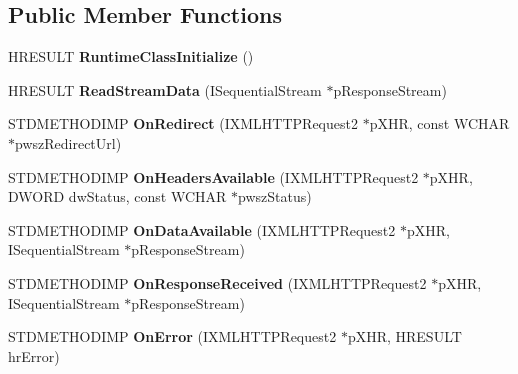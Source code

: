 \subsection*{Public Member Functions}
\begin{DoxyCompactItemize}
\item 
\mbox{\label{classnetwork_1_1CXHR2Callback_a0b409a974aa73213b058d9627a95bb62}} 
H\+R\+E\+S\+U\+LT {\bfseries Runtime\+Class\+Initialize} ()
\item 
\mbox{\label{classnetwork_1_1CXHR2Callback_a19e4f5c8202744a013a70d698154fb11}} 
H\+R\+E\+S\+U\+LT {\bfseries Read\+Stream\+Data} (I\+Sequential\+Stream $\ast$p\+Response\+Stream)
\item 
\mbox{\label{classnetwork_1_1CXHR2Callback_a557f73de73cba3965d13bdb789138c56}} 
S\+T\+D\+M\+E\+T\+H\+O\+D\+I\+MP {\bfseries On\+Redirect} (I\+X\+M\+L\+H\+T\+T\+P\+Request2 $\ast$p\+X\+HR, const W\+C\+H\+AR $\ast$pwsz\+Redirect\+Url)
\item 
\mbox{\label{classnetwork_1_1CXHR2Callback_ad498765d3bc7a088c8f5dbcfbee6e054}} 
S\+T\+D\+M\+E\+T\+H\+O\+D\+I\+MP {\bfseries On\+Headers\+Available} (I\+X\+M\+L\+H\+T\+T\+P\+Request2 $\ast$p\+X\+HR, D\+W\+O\+RD dw\+Status, const W\+C\+H\+AR $\ast$pwsz\+Status)
\item 
\mbox{\label{classnetwork_1_1CXHR2Callback_a1c4f3750bf64c073ea08bb49435f456b}} 
S\+T\+D\+M\+E\+T\+H\+O\+D\+I\+MP {\bfseries On\+Data\+Available} (I\+X\+M\+L\+H\+T\+T\+P\+Request2 $\ast$p\+X\+HR, I\+Sequential\+Stream $\ast$p\+Response\+Stream)
\item 
\mbox{\label{classnetwork_1_1CXHR2Callback_a2cb20c0becf658b27d6ffcbb4867e80c}} 
S\+T\+D\+M\+E\+T\+H\+O\+D\+I\+MP {\bfseries On\+Response\+Received} (I\+X\+M\+L\+H\+T\+T\+P\+Request2 $\ast$p\+X\+HR, I\+Sequential\+Stream $\ast$p\+Response\+Stream)
\item 
\mbox{\label{classnetwork_1_1CXHR2Callback_ab44b25f939553b8826f8464df9a5cf86}} 
S\+T\+D\+M\+E\+T\+H\+O\+D\+I\+MP {\bfseries On\+Error} (I\+X\+M\+L\+H\+T\+T\+P\+Request2 $\ast$p\+X\+HR, H\+R\+E\+S\+U\+LT hr\+Error)

\end{DoxyCompactItemize}
